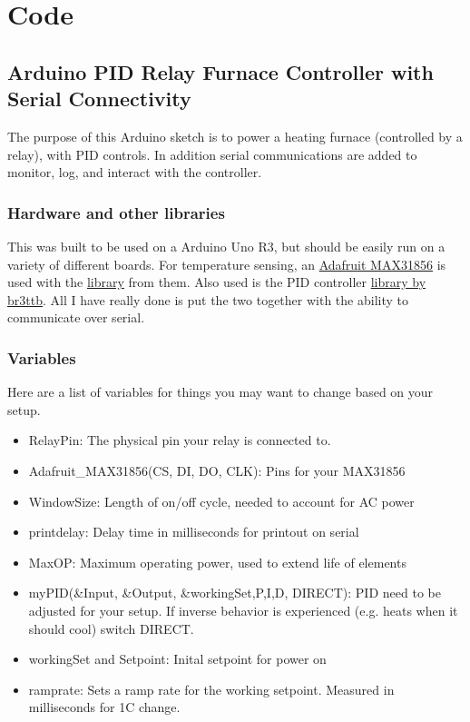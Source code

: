 

\chapter{Code}

\section{Arduino PID Relay Furnace Controller with Serial
Connectivity}\label{arduino-pid-relay-furnace-controller-with-serial-connectivity}
\label{app:PID}

The purpose of this Arduino sketch is to power a heating furnace
(controlled by a relay), with PID controls. In addition serial
communications are added to monitor, log, and interact with the
controller.

\subsection{Hardware and other
libraries}\label{hardware-and-other-libraries}

This was built to be used on a Arduino Uno R3, but should be easily run
on a variety of different boards. For temperature sensing, an
\href{https://www.adafruit.com/product/3263}{Adafruit MAX31856} is used
with the \href{https://github.com/adafruit/Adafruit_MAX31856}{library}
from them. Also used is the PID controller
\href{https://github.com/br3ttb/Arduino-PID-Library}{library by br3ttb}.
All I have really done is put the two together with the ability to
communicate over serial.

\subsection{Variables}\label{variables}

Here are a list of variables for things you may want to change based on
your setup.

\begin{itemize}
\item
  RelayPin: The physical pin your relay is connected to.
\item
  Adafruit\_MAX31856(CS, DI, DO, CLK): Pins for your MAX31856
\item
  WindowSize: Length of on/off cycle, needed to account for AC power
\item
  printdelay: Delay time in milliseconds for printout on serial
\item
  MaxOP: Maximum operating power, used to extend life of elements
\item
  myPID(\&Input, \&Output, \&workingSet,P,I,D, DIRECT): PID need to be adjusted for your setup.
  If inverse behavior is experienced (e.g. heats when it should cool) switch DIRECT.
\item
  workingSet and Setpoint: Inital setpoint for power on
\item
  ramprate: Sets a ramp rate for the working setpoint. Measured in
  milliseconds for 1C change.
\end{itemize}

